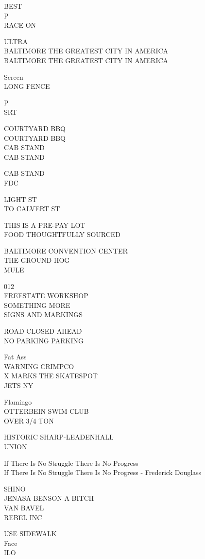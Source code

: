 \documentclass[10pt,letterpaper]{article}
\begin{document}
BEST\\
P\\
RACE ON

ULTRA\\
BALTIMORE THE GREATEST CITY IN AMERICA\\
BALTIMORE THE GREATEST CITY IN AMERICA

Screen\\
LONG FENCE

P\\
SRT

COURTYARD BBQ\\
COURTYARD BBQ\\
CAB STAND\\
CAB STAND

CAB STAND\\
FDC

LIGHT ST\\
TO CALVERT ST

THIS IS A PRE{-}PAY LOT\\
FOOD THOUGHTFULLY SOURCED

BALTIMORE CONVENTION CENTER\\
THE GROUND HOG\\
MULE

012\\
FREESTATE WORKSHOP\\
SOMETHING MORE\\
SIGNS AND MARKINGS

ROAD CLOSED AHEAD\\
NO PARKING PARKING

Fat Ass\\
WARNING CRIMPCO\\
X MARKS THE SKATESPOT\\
JETS NY

Flamingo\\
OTTERBEIN SWIM CLUB\\
OVER 3/4 TON

HISTORIC SHARP{-}LEADENHALL\\
UNION

If There Is No Struggle There Is No Progress\\
If There Is No Struggle There Is No Progress {-} Frederick Douglass

SHINO\\
JENASA BENSON A BITCH\\
VAN BAVEL\\
REBEL INC

USE SIDEWALK\\
Face\\
ILO
\end{document}

